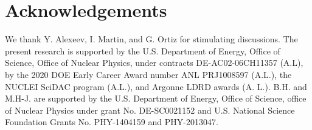 \documentclass[aps,pre,floatfix,showpacs,twocolumn, preprintnumbers]{revtex4-1}
\begin{document}
\section*{Acknowledgements}
We thank Y. Alexeev, I. Martin, and G. Ortiz for stimulating discussions. The present research is supported by the U.S. Department of Energy, Office of Science, Office of Nuclear Physics, under contracts DE-AC02-06CH11357 (A.L), by the 2020 DOE Early Career Award number ANL PRJ1008597 (A.L.), the NUCLEI SciDAC program (A.L.), and Argonne LDRD awards (A. L.). 
B.H. and M.H-J. are supported by the U.S. Department of Energy,
Office of Science, office of Nuclear Physics under grant
No. DE-SC0021152 and U.S. National Science Foundation Grants
No. PHY-1404159 and PHY-2013047.







\end{document}
